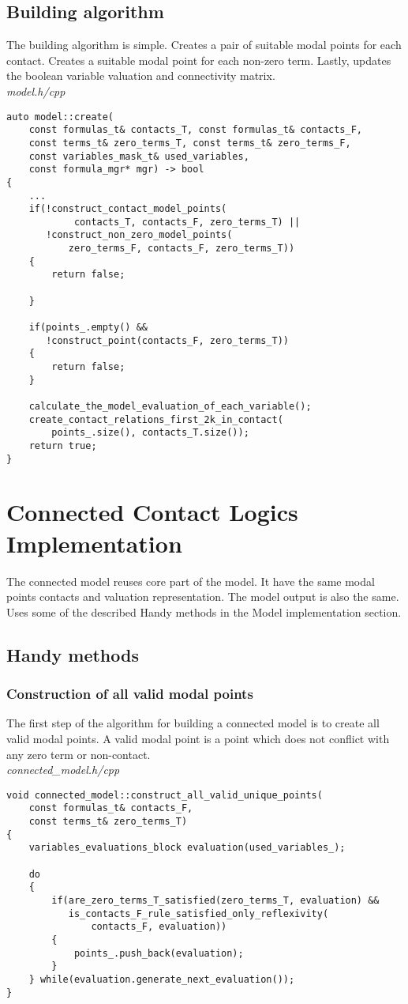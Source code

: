 \documentclass{article}
\begin{document}
	\subsection{Building algorithm}
	The building algorithm is simple. Creates a pair of suitable modal points for each contact. Creates a suitable modal point for each non-zero term. Lastly, updates the boolean variable valuation and connectivity matrix.
\\
\noindent
\textit{model.h/cpp}
\begin{lstlisting}
auto model::create(
	const formulas_t& contacts_T, const formulas_t& contacts_F,
	const terms_t& zero_terms_T, const terms_t& zero_terms_F,
	const variables_mask_t& used_variables,
	const formula_mgr* mgr) -> bool
{
    ...
    if(!construct_contact_model_points(
            contacts_T, contacts_F, zero_terms_T) ||
       !construct_non_zero_model_points(
           zero_terms_F, contacts_F, zero_terms_T))
    {
        return false;

    }

    if(points_.empty() &&
       !construct_point(contacts_F, zero_terms_T))
    {
        return false;
    }

    calculate_the_model_evaluation_of_each_variable();
    create_contact_relations_first_2k_in_contact(
        points_.size(), contacts_T.size());
    return true;
}
\end{lstlisting}

	\newpage
	\section{Connected Contact Logics Implementation}
	The connected model reuses core part of the model. It have the same modal points contacts and valuation representation. The model output is also the same. Uses some of the described Handy methods in the Model implementation section.

	\subsection{Handy methods}
	\subsubsection*{Construction of all valid modal points}
	The first step of the algorithm for building a connected model is to create all valid modal points. A valid modal point is a point which does not conflict with any zero term or non-contact.
\\
\noindent
\textit{connected\_model.h/cpp}
\begin{lstlisting}
void connected_model::construct_all_valid_unique_points(
	const formulas_t& contacts_F,
	const terms_t& zero_terms_T)
{
    variables_evaluations_block evaluation(used_variables_);

    do
    {
        if(are_zero_terms_T_satisfied(zero_terms_T, evaluation) &&
           is_contacts_F_rule_satisfied_only_reflexivity(
               contacts_F, evaluation))
        {
            points_.push_back(evaluation);
        }
    } while(evaluation.generate_next_evaluation());
}
\end{lstlisting}
\end{document}
